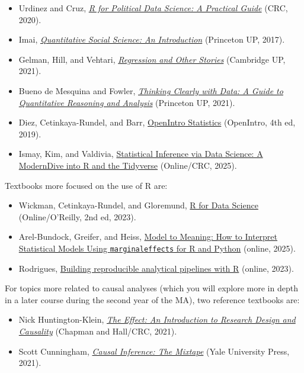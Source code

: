 \documentclass[12pt, a4paper]{article}
\begin{document}
\begin{itemize}
\setlength\itemsep{-5pt}
  \item Urdinez and Cruz, \href{https://www.routledge.com/R-for-Political-Data-Science-A-Practical-Guide/Urdinez-Cruz/p/book/9780367818838}{\textit{R for Political Data Science: A Practical Guide}} (CRC, 2020).
  \item Imai, \href{https://press.princeton.edu/books/hardcover/9780691167039/quantitative-social-science}{\textit{Quantitative Social Science: An Introduction}} (Princeton UP, 2017).
  \item Gelman, Hill, and Vehtari, \href{https://avehtari.github.io/ROS-Examples/}{\textit{Regression and Other Stories}} (Cambridge UP, 2021).
  \item Bueno de Mesquina and Fowler, \href{https://press.princeton.edu/books/hardcover/9780691214368/thinking-clearly-with-data}{\textit{Thinking Clearly with Data: A Guide to Quantitative Reasoning and Analysis}} (Princeton UP, 2021).
  \item Diez, Cetinkaya-Rundel, and Barr, \href{https://www.openintro.org/book/os/}{OpenIntro Statistics} (OpenIntro, 4th ed, 2019).
  \item Ismay, Kim, and Valdivia, \href{https://moderndive.com/}{Statistical Inference via Data Science: A ModernDive into R and the Tidyverse} (Online/CRC, 2025).
\end{itemize}


Textbooks more focused on the use of R are:

\begin{itemize}
\setlength\itemsep{-5pt}
  \item Wickman, Cetinkaya-Rundel, and Gloremund, \href{https://r4ds.hadley.nz/}{R for Data Science} (Online/O'Reilly, 2nd ed, 2023).
  \item Arel-Bundock, Greifer, and Heiss, \href{https://marginaleffects.com/chapters/who.html}{Model to Meaning: How to Interpret Statistical Models Using \texttt{marginaleffects} for R and Python} (online, 2025).
  \item Rodrigues, \href{https://raps-with-r.dev/}{Building reproducible analytical pipelines with R} (online, 2023).
\end{itemize}

For topics more related to causal analyses (which you will explore more in depth in a later course during the second year of the MA), two reference textbooks are:

\begin{itemize}
\setlength\itemsep{-5pt}
  \item Nick Huntington-Klein, \href{https://theeffectbook.net/}{\textit{The Effect: An Introduction to Research Design and Causality}} (Chapman and Hall/CRC, 2021).
  \item Scott Cunningham, \href{https://mixtape.scunning.com/}{\textit{Causal Inference: The Mixtape}} (Yale University Press, 2021).
\end{itemize}
\end{document}
